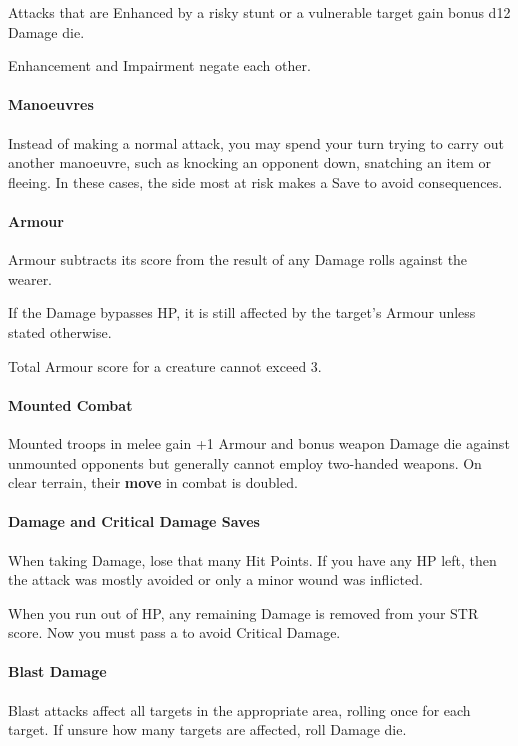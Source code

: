 \documentclass[itdr/core]{subfiles}
\begin{document}
Attacks that are Enhanced by a risky stunt or a vulnerable target gain bonus d12 Damage die.

Enhancement and Impairment negate each other.

\paragraph{Manoeuvres}
Instead of making a normal attack, you may spend your turn trying to carry out another manoeuvre, such as knocking an opponent down, snatching an item or fleeing. In these cases, the side most at risk makes a Save to avoid consequences.

\paragraph{Armour}
Armour subtracts its score from the result of any Damage rolls against the wearer.

If the Damage bypasses HP, it is still affected by the target's Armour unless stated otherwise.

Total Armour score for a creature cannot exceed 3.

\paragraph{Mounted Combat}

Mounted troops in melee gain +1 Armour and bonus weapon Damage die against unmounted opponents but generally cannot employ two-handed weapons. On clear terrain, their \textbf{move} in combat is doubled.

\paragraph{Damage and Critical Damage Saves}
When taking Damage, lose that many Hit Points. If you have any HP left, then the attack was mostly avoided or only a minor wound was inflicted.

When you run out of HP, any remaining Damage is removed from your STR score. Now you must pass a  to avoid Critical Damage.

\paragraph{Blast Damage}
Blast attacks affect all targets in the appropriate area, rolling once for each target. If unsure how many targets are affected, roll Damage die.
\end{document}
